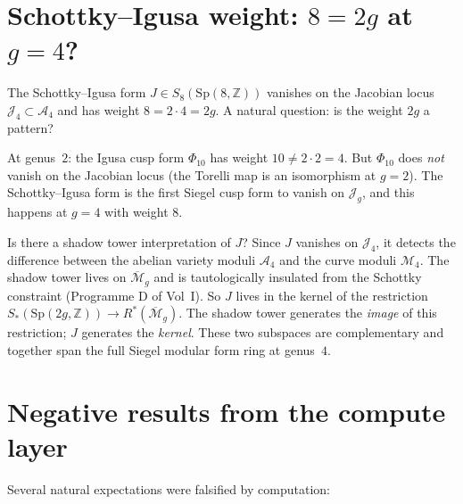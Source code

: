 \documentclass[11pt]{article}
\newcommand{\cA}{\mathcal{A}}
\newcommand{\cM}{\mathcal{M}}
\newcommand{\cJ}{\mathcal{J}}
\newcommand{\Z}{\mathbb{Z}}
\begin{document}
\section{Schottky--Igusa weight: $8 = 2g$ at $g = 4$?}
\label{sec:schottky-weight}

The Schottky--Igusa form $J \in S_8(\mathrm{Sp}(8,\Z))$ vanishes on the Jacobian locus $\cJ_4 \subset \cA_4$ and has weight $8 = 2 \cdot 4 = 2g$. A natural question: is the weight $2g$ a pattern?

At genus~$2$: the Igusa cusp form $\Phi_{10}$ has weight $10 \neq 2 \cdot 2 = 4$. But $\Phi_{10}$ does \emph{not} vanish on the Jacobian locus (the Torelli map is an isomorphism at $g = 2$). The Schottky--Igusa form is the first Siegel cusp form to vanish on $\cJ_g$, and this happens at $g = 4$ with weight $8$.

\begin{question}
Is there a shadow tower interpretation of $J$? Since $J$ vanishes on $\cJ_4$, it detects the difference between the abelian variety moduli $\cA_4$ and the curve moduli $\cM_4$. The shadow tower lives on $\overline{\cM}_g$ and is tautologically insulated from the Schottky constraint (Programme D of Vol~I). So $J$ lives in the kernel of the restriction $S_*(\mathrm{Sp}(2g,\Z)) \to R^*(\overline{\cM}_g)$. The shadow tower generates the \emph{image} of this restriction; $J$ generates the \emph{kernel}. These two subspaces are complementary and together span the full Siegel modular form ring at genus~$4$.
\end{question}


\section{Negative results from the compute layer}
\label{sec:negative-results}

Several natural expectations were falsified by computation:
\end{document}
